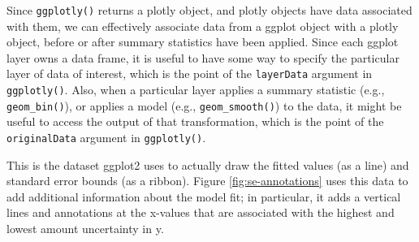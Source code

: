 \documentclass[12pt,]{isuthesis}
\newenvironment{Shaded}{\begin{snugshade}}{\end{snugshade}}
\newcommand{\KeywordTok}[1]{\textcolor[rgb]{0.13,0.29,0.53}{\textbf{{#1}}}}
\newcommand{\DataTypeTok}[1]{\textcolor[rgb]{0.13,0.29,0.53}{{#1}}}
\newcommand{\DecValTok}[1]{\textcolor[rgb]{0.00,0.00,0.81}{{#1}}}
\newcommand{\StringTok}[1]{\textcolor[rgb]{0.31,0.60,0.02}{{#1}}}
\newcommand{\CommentTok}[1]{\textcolor[rgb]{0.56,0.35,0.01}{\textit{{#1}}}}
\newcommand{\OtherTok}[1]{\textcolor[rgb]{0.56,0.35,0.01}{{#1}}}
\newcommand{\NormalTok}[1]{{#1}}
\begin{document}
Since \texttt{ggplotly()} returns a plotly object, and plotly objects
have data associated with them, we can effectively associate data from a
ggplot object with a plotly object, before or after summary statistics
have been applied. Since each ggplot layer owns a data frame, it is
useful to have some way to specify the particular layer of data of
interest, which is the point of the \texttt{layerData} argument in
\texttt{ggplotly()}. Also, when a particular layer applies a summary
statistic (e.g., \texttt{geom\_bin()}), or applies a model (e.g.,
\texttt{geom\_smooth()}) to the data, it might be useful to access the
output of that transformation, which is the point of the
\texttt{originalData} argument in \texttt{ggplotly()}.

\begin{Shaded}
\end{Shaded}

This is the dataset ggplot2 uses to actually draw the fitted values (as
a line) and standard error bounds (as a ribbon). Figure
\ref{fig:se-annotations} uses this data to add additional information
about the model fit; in particular, it adds a vertical lines and
annotations at the x-values that are associated with the highest and
lowest amount uncertainty in y.
\end{document}
